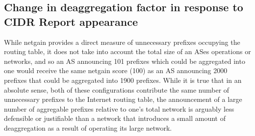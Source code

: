 % 
% 
% 

\subsection{Change in deaggregation factor in response to CIDR Report
appearance}

While netgain provides a direct measure of unnecessary prefixes occupying the
routing table, it does not take into account the total size of an ASes
operations or networks, and so an AS announcing 101 prefixes which could be
aggregated into one would receive the same netgain score (100) as an AS
announcing 2000 prefixes that could be aggregated into 1900 prefixes. While it
is true that in an absolute sense, both of these configurations contribute the
same number of unnecessary prefixes to the Internet routing table, the
announcement of a large number of aggregable prefixes relative to one's total
network is arguably less defensible or justifiable than a network that
introduces a small amount of deaggregation as a result of operating its large
network. 

